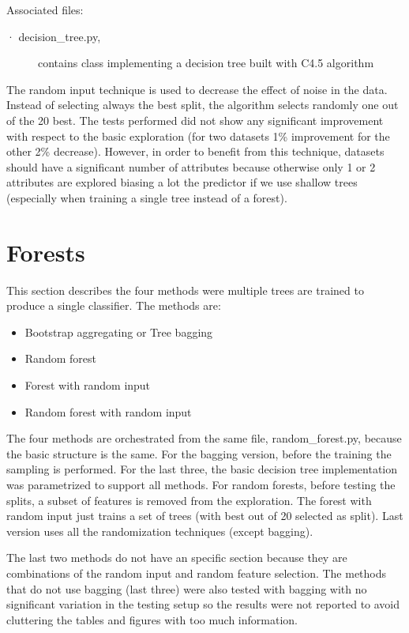 \documentclass[a4paper,10pt]{article}
\begin{document}
Associated files:
\begin{description}
 \item [· decision\_tree.py,] contains class implementing a decision tree built with C4.5 algorithm
\end{description}

The random input technique is used to decrease the effect of noise in the data. Instead of selecting always the best split, the algorithm selects randomly one out of the 20 best. The tests performed did not show any significant improvement with respect to the basic exploration (for two datasets 1\% improvement for the other 2\% decrease). However, in order to benefit from this technique, datasets should have a significant number of attributes because otherwise only 1 or 2 attributes are explored biasing a lot the predictor if we use shallow trees (especially when training a single tree instead of a forest).

\section{Forests}

This section describes the four methods were multiple trees are trained to produce a single classifier. The methods are:

\begin{itemize}
 \item Bootstrap aggregating or Tree bagging
 \item Random forest
 \item Forest with random input
 \item Random forest with random input
\end{itemize}

The four methods are orchestrated from the same file, random\_forest.py, because the basic structure is the same. For the bagging version, before the training the sampling is performed. For the last three, the basic decision tree implementation was parametrized to support all methods. For random forests, before testing the splits, a subset of features is removed from the exploration. The forest with random input just trains a set of trees (with best out of 20 selected as split). Last version uses all the randomization techniques (except bagging).

The last two methods do not have an specific section because they are combinations of the random input and random feature selection. The methods that do not use bagging (last three) were also tested with bagging with no significant variation in the testing setup so the results were not reported to avoid cluttering the tables and figures with too much information.
\end{document}
